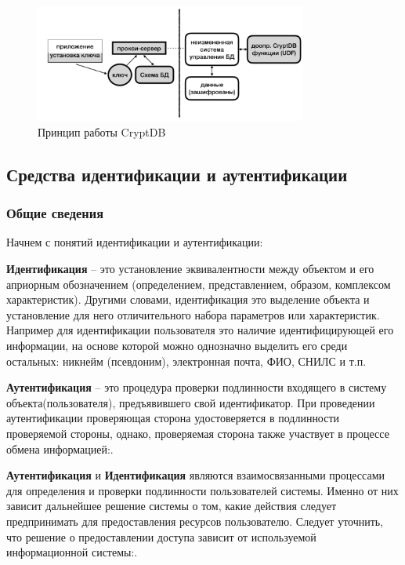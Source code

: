 \begin{figure}[h]
    \centering
    \includegraphics[width=0.8\textwidth]{assets/CryptDB.png}
                \caption{Принцип работы CryptDB}
    \label{fig:CryptDB}
\end{figure}


\subsection{Средства идентификации и аутентификации}
\subsubsection{Общие сведения}
Начнем с понятий идентификации и аутентификации:

\textbf{Идентификация} – это установление эквивалентности между объектом и его априорным
обозначением (определением, представлением, образом, комплексом характеристик). Другими словами,
идентификация это выделение объекта и установление для него отличительного набора параметров или
характеристик. Например для идентификации пользователя это наличие идентифицирующей его
информации, на основе которой можно однозначно выделить его среди остальных: никнейм (псевдоним),
электронная почта, ФИО, СНИЛС и т.п.\cite{crypto-methods}

\textbf{Аутентификация} – это процедура проверки подлинности входящего в систему объекта(пользователя),
предъявившего свой идентификатор. При проведении аутентификации проверяющая сторона удостоверяется в подлинности
проверяемой стороны, однако, проверяемая сторона также участвует в процессе обмена информацией\cite{crypto-methods}:.

\textbf{Аутентификация} и \textbf{Идентификация} являются взаимосвязанными процессами для определения и проверки
подлинности пользователей системы. Именно от них зависит дальнейшее решение системы о том, какие
действия следует предпринимать для предоставления ресурсов пользователю. Следует уточнить, что
решение о предоставлении доступа зависит от используемой информационной системы\cite{crypto-methods}:.


